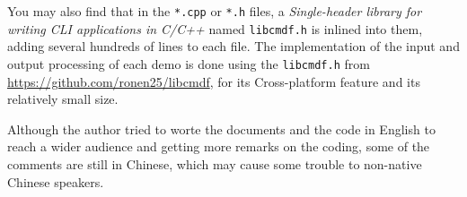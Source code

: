 \documentclass[cn,black,12pt,normal]{elegantnote}
\begin{document}
You may also find that in the \lstinline{*.cpp} or \lstinline{*.h} files, a \textit{Single-header library for writing CLI applications in C/C++} named \lstinline{libcmdf.h} is inlined into them, adding several hundreds of lines to each file. The implementation of the input and output processing of each demo is done using the \lstinline{libcmdf.h} from \url{https://github.com/ronen25/libcmdf}, for its Cross-platform feature and its relatively small size.

Although the author tried to worte the documents and the code in English to reach a wider audience and getting more remarks on the coding, some of the comments are still in Chinese, which may cause some trouble to non-native Chinese speakers.
\end{document}
